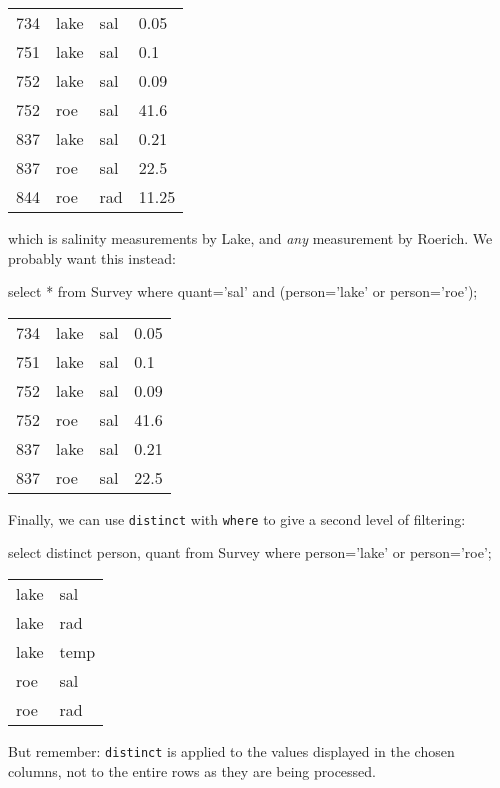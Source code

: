 \documentclass{book}
\begin{document}
\begin{tabular}{llll}
734 & lake & sal & 0.05 \\
751 & lake & sal & 0.1 \\
752 & lake & sal & 0.09 \\
752 & roe & sal & 41.6 \\
837 & lake & sal & 0.21 \\
837 & roe & sal & 22.5 \\
844 & roe & rad & 11.25 \\
\end{tabular}

which is salinity measurements by Lake, and \emph{any} measurement by
Roerich. We probably want this instead:

\begin{VerbIn}
select * from Survey where quant='sal' and (person='lake' or person='roe');
\end{VerbIn}

\begin{tabular}{llll}
734 & lake & sal & 0.05 \\
751 & lake & sal & 0.1 \\
752 & lake & sal & 0.09 \\
752 & roe & sal & 41.6 \\
837 & lake & sal & 0.21 \\
837 & roe & sal & 22.5 \\
\end{tabular}

Finally, we can use \texttt{distinct} with \texttt{where} to give a
second level of filtering:

\begin{VerbIn}
select distinct person, quant from Survey where person='lake' or person='roe';
\end{VerbIn}

\begin{tabular}{ll}
lake & sal \\
lake & rad \\
lake & temp \\
roe & sal \\
roe & rad \\
\end{tabular}

But remember: \texttt{distinct} is applied to the values displayed in
the chosen columns, not to the entire rows as they are being processed.
\end{document}
